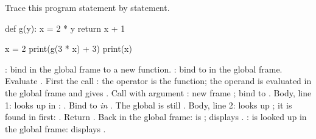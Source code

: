 \documentclass[10pt]{scrartcl}
\begin{document}
\begin{example*}
Trace this program statement by statement.
\begin{py}
def g(y):
    x = 2 * y
    return x + 1

x = 2
print(g(3 * x) + 3)
print(x)
\end{py}
\begin{steps}
  \ii {}: bind  in the global frame to a new function.
  \ii {}: bind  to  in the global frame.
  \ii Evaluate . First the call : the operator  is the function; the operand  is evaluated in the global frame and gives .
  \ii Call  with argument : new frame ; bind  to .
  \ii Body, line 1:  looks up  in : . Bind  to  \emph{in }. The global  is still .
  \ii Body, line 2:  looks up ; it is found in  first: . Return .
  \ii Back in the global frame:  is ;  displays .
  \ii {}:  is looked up in the global frame: displays .
\end{steps}
\end{example*}
\end{document}

